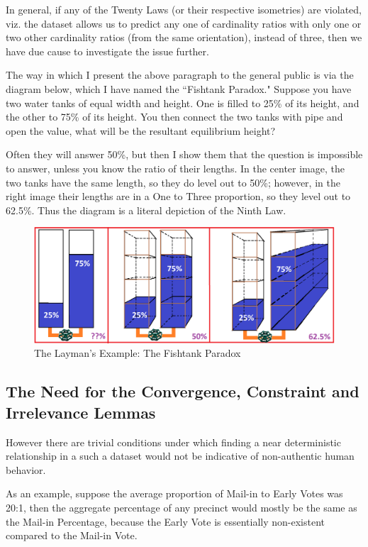 \documentclass[preprint,13pt]{elsarticle}
\begin{document}
In general, if any of the Twenty Laws (or their respective isometries) are violated, viz. the dataset allows us to predict any one of cardinality ratios with only one or two other cardinality ratios (from the same orientation), instead of three, then we have due cause to investigate the issue further.

The way in which I present the above paragraph to the general public is via the diagram below, which I have named the ``Fishtank Paradox."  Suppose you have two water tanks of equal width and height. One is filled to 25\% of its height, and the other to 75\% of its height. You then connect the two tanks with pipe and open the value, what will be the resultant equilibrium height?

Often they will answer 50\%, but then I show them that the question is impossible to answer, unless you know the ratio of their lengths. In the center image, the two tanks have the same length, so they do level out to 50\%; however, in the right image their lengths are in a One to Three proportion, so they level out to 62.5\%. Thus the diagram is a literal depiction of the Ninth Law.
\begin{figure}[bp!]
\begin{center}
\caption{The Layman's Example: The Fishtank Paradox}
\includegraphics[width=350pt]{Fishtank.png}
\end{center}
\end{figure}

\newpage
\subsection{The Need for the Convergence, Constraint and Irrelevance Lemmas}
However there are trivial conditions under which finding a near deterministic relationship in a such a dataset would not be indicative of non-authentic human behavior.

As an example, suppose the average proportion of Mail-in to Early Votes was 20:1, then the aggregate percentage of any precinct would mostly be the same as the Mail-in Percentage, because the Early Vote is essentially non-existent compared to the Mail-in Vote.
\end{document}
